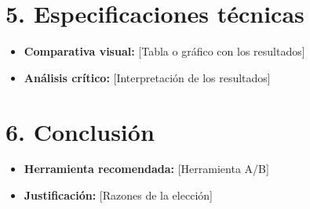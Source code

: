 \documentclass[12pt, a4paper]{article}
\begin{document}
\section*{5. Especificaciones técnicas}
\begin{itemize}
    \item \textbf{Comparativa visual:} [Tabla o gráfico con los resultados]
    \item \textbf{Análisis crítico:} [Interpretación de los resultados]
\end{itemize}
\section*{6. Conclusión}
\begin{itemize}
    \item \textbf{Herramienta recomendada:} [Herramienta A/B]
    \item \textbf{Justificación:} [Razones de la elección]
\end{itemize}
\end{document}
